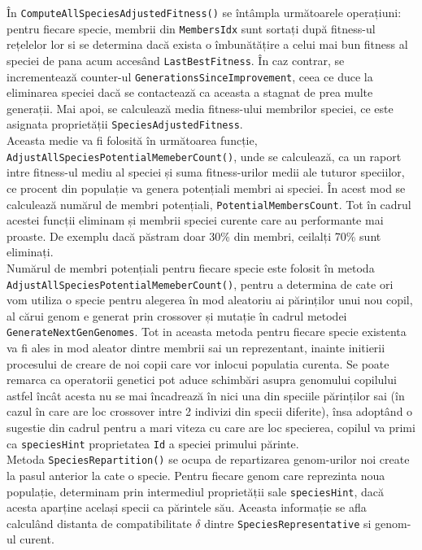 În \texttt{Compute\-All\-Species\-Adjusted\-Fitness()} se întâmpla următoarele operațiuni: pentru fiecare specie, membrii din \texttt{Members\-Idx} sunt sortați după fitness-ul rețelelor lor si se determina dacă exista o îmbunătățire a celui mai bun fitness al speciei de pana acum accesând \texttt{Last\-Best\-Fitness}. În caz contrar, se incrementează counter-ul \texttt{Generations\-Since\-Improvement}, ceea ce duce la eliminarea speciei dacă se contactează ca aceasta a stagnat de prea multe generații.
Mai apoi, se calculează media fitness-ului membrilor speciei, ce este asignata proprietății \texttt{Species\-Adjusted\-Fitness}.
\\
Aceasta medie va fi folosită în următoarea funcție, \texttt{Adjust\-All\-Species\-Potential\-Memeber\-Count()}, unde se calculează, ca un raport intre fitness-ul mediu al speciei și suma fitness-urilor medii ale tuturor speciilor, ce procent din populație va genera potențiali membri ai speciei. În acest mod se calculează numărul de membri potențiali, \texttt{Potential\-Members\-Count}. 
Tot în cadrul acestei funcții eliminam și membrii speciei curente care au performante mai proaste. De exemplu dacă păstram doar 30\% din membri,
ceilalți 70\% sunt eliminați. 
\\
Numărul de membri potențiali pentru fiecare specie este folosit în metoda \texttt{Adjust\-AllSpecies\-Potential\-Memeber\-Count()}, pentru a determina de cate ori vom utiliza o specie pentru alegerea în mod aleatoriu ai părinților unui nou copil, al cărui genom e generat prin crossover și mutație în cadrul metodei \texttt{Generate\-Next\-Gen\-Genomes}.
Tot in aceasta metoda pentru fiecare specie existenta va fi ales in mod aleator dintre membrii sai un reprezentant, inainte initierii procesului de creare de noi copii care vor inlocui populatia curenta.
Se poate remarca ca operatorii genetici pot aduce schimbări asupra genomului copilului astfel încât acesta nu se mai încadrează în nici una din speciile părinților sai (în cazul în care are loc crossover intre 2 indivizi din specii diferite), însa adoptând o sugestie din cadrul \cite{NeatFAQ} pentru a mari viteza cu care are loc specierea, copilul va primi ca \texttt{species\-Hint} proprietatea \texttt{Id} a speciei primului părinte.
\\
Metoda \texttt{Species\-Repartition()} se ocupa de repartizarea genom-urilor noi create la pasul anterior la cate o specie.
Pentru fiecare genom care reprezinta noua populație, determinam prin intermediul proprietății sale \texttt{species\-Hint}, dacă acesta aparține același specii ca părintele său. Aceasta informație  se afla calculând distanta de compatibilitate $\delta$ dintre \texttt{Species\-Representative} si genom-ul curent.
